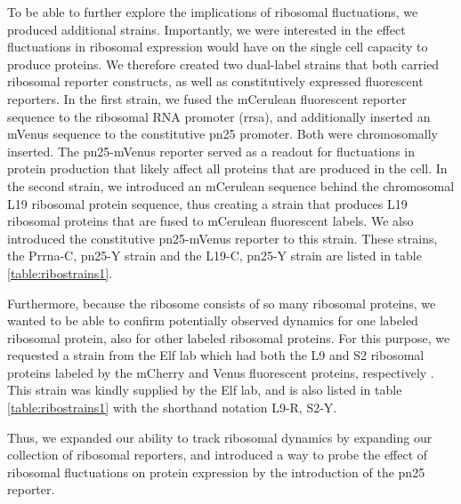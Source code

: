 To be able to further explore the implications of ribosomal fluctuations, 
we produced additional strains.
%
Importantly, we were interested in the effect fluctuations in ribosomal expression would have on 
the single cell capacity to produce proteins.
%
We therefore created two dual-label strains that both carried ribosomal reporter constructs, as well as constitutively expressed fluorescent reporters.
%
In the first strain, we fused the mCerulean fluorescent reporter sequence to the ribosomal RNA promoter (rrsa), and additionally inserted an mVenus sequence to the constitutive pn25 promoter. Both were chromosomally inserted.
%
The pn25-mVenus reporter served as a readout for fluctuations in protein production that likely affect all proteins that are produced in the cell. 
%
In the second strain, we introduced an mCerulean sequence behind the chromosomal L19 ribosomal protein sequence, thus creating a strain that produces L19 ribosomal proteins that are fused to mCerulean fluorescent labels.
We also introduced the constitutive pn25-mVenus reporter to this strain.
%
These strains, the Prrna-C, pn25-Y strain and the L19-C, pn25-Y strain are listed in table \ref{table:ribostrains1}.

Furthermore, because the ribosome consists of so many ribosomal proteins, we wanted to be able to confirm 
potentially observed dynamics for one labeled ribosomal protein, also for other labeled ribosomal proteins.
%
For this purpose, we requested a strain from the Elf lab which had both the L9 and S2 ribosomal proteins labeled by the mCherry and Venus fluorescent proteins, respectively \cite{Wallden2016}.
This strain was kindly supplied by the Elf lab, and is also listed in table \ref{table:ribostrains1} with the shorthand notation L9-R, S2-Y.

Thus, we expanded our ability to track ribosomal dynamics by 
expanding our collection of ribosomal reporters, 
and introduced a way to probe the effect of ribosomal fluctuations on protein expression by the introduction of the pn25 reporter.


